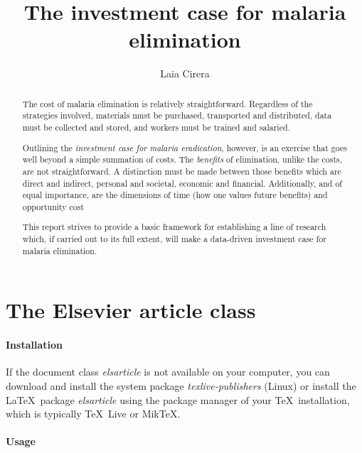 \documentclass[]{elsarticle} %
\begin{document}
\begin{frontmatter}

  \title{The investment case for malaria elimination}
    \author[Centro de Investigação em Saude de Manhiça]{Laia Cirera}
      \address[CISM]{Rua Cambeve 12. Manhiça, Mozambique}
  
  \begin{abstract}
  The cost of malaria elimination is relatively straightforward.
  Regardless of the strategies involved, materials must be purchased,
  transported and distributed, data must be collected and stored, and
  workers must be trained and salaried.
  
  Outlining the \emph{investment case for malaria eradication}, however,
  is an exercise that goes well beyond a simple summation of costs. The
  \emph{benefits} of elimination, unlike the costs, are not
  straightforward. A distinction must be made between those benefits which
  are direct and indirect, personal and societal, economic and financial.
  Additionally, and of equal importance, are the dimensions of time (how
  one values future benefits) and opportunity cost
  
  This report strives to provide a basic framework for establishing a line
  of research which, if carried out to its full extent, will make a
  data-driven investment case for malaria elimination.
  \end{abstract}
  
 \end{frontmatter}

\section{The Elsevier article class}\label{the-elsevier-article-class}

\paragraph{Installation}\label{installation}

If the document class \emph{elsarticle} is not available on your
computer, you can download and install the system package
\emph{texlive-publishers} (Linux) or install the LaTeX~package
\emph{elsarticle} using the package manager of your TeX~installation,
which is typically TeX~Live or MikTeX.

\paragraph{Usage}\label{usage}
\end{document}
